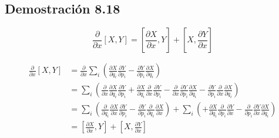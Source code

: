 \documentclass{article}
\begin{document}
\subsection*{Demostración 8.18}
\[ \frac{\partial }{\partial x}[X,Y] = [\frac{\partial X}{\partial x},Y] + [X,\frac{\partial Y}{\partial x}] \]
\begin{tcolorbox}[breakable]
    \begin{align*}
        \frac{\partial }{\partial x}[X,Y]
        &=\frac{\partial }{\partial x} \sum_{i} \left(
        \frac{\partial X}{\partial q_i} \frac{\partial Y}{\partial p_i}
        -\frac{\partial Y}{\partial p_i}\frac{\partial X}{\partial q_i} \right) \\
        &= \sum_{i} \left(
        \frac{\partial}{\partial x}\frac{\partial X}{\partial q_i} \frac{\partial Y}{\partial p_i}
        +\frac{\partial X}{\partial q_i}\frac{\partial}{\partial x}  \frac{\partial Y}{\partial p_i} 
        -\frac{\partial}{\partial x} \frac{\partial Y}{\partial p_i}\frac{\partial X}{\partial q_i} 
        -\frac{\partial Y}{\partial p_i}\frac{\partial}{\partial x} \frac{\partial X}{\partial q_i}
        \right) \\
        &= \sum_{i} \left(
        \frac{\partial}{\partial q_i}\frac{\partial X}{\partial x} \frac{\partial Y}{\partial p_i}
        -\frac{\partial Y}{\partial p_i}\frac{\partial}{\partial q_i} \frac{\partial X}{\partial x}
        \right)
        +\sum_{i} \left( 
        +\frac{\partial X}{\partial q_i}\frac{\partial}{\partial p_i} \frac{\partial Y}{\partial x} 
        -\frac{\partial}{\partial p_i} \frac{\partial Y}{\partial x}\frac{\partial X}{\partial q_i} 
        \right) \\
        &= [\frac{\partial X}{\partial x},Y] + [X,\frac{\partial Y}{\partial x}] 
    \end{align*}
\end{tcolorbox}
\end{document}
